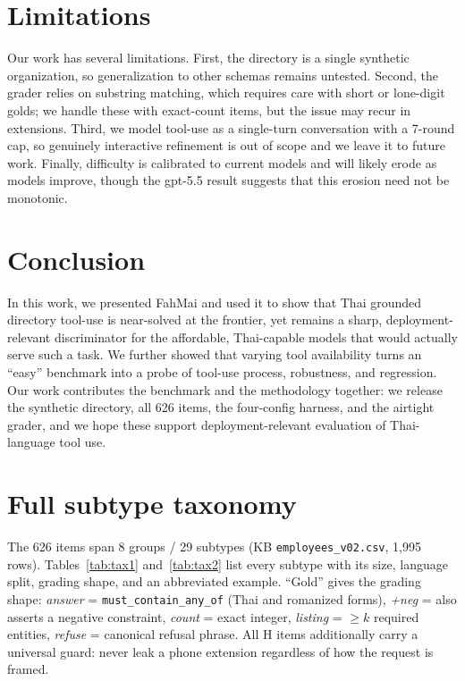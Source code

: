 \documentclass[11pt]{article}
\begin{document}
\section{Limitations}

Our work has several limitations. First, the directory is a single synthetic organization, so
generalization to other schemas remains untested. Second, the grader relies on substring matching,
which requires care with short or lone-digit golds; we handle these with exact-count items, but the
issue may recur in extensions. Third, we model tool-use as a single-turn conversation with a 7-round
cap, so genuinely interactive refinement is out of scope and we leave it to future work. Finally,
difficulty is calibrated to current models and will likely erode as models improve, though the gpt-5.5
result suggests that this erosion need not be monotonic.

\section{Conclusion}

In this work, we presented FahMai and used it to show that Thai grounded directory tool-use is
near-solved at the frontier, yet remains a sharp, deployment-relevant discriminator for the affordable,
Thai-capable models that would actually serve such a task. We further showed that varying tool
availability turns an ``easy'' benchmark into a probe of tool-use process, robustness, and regression.
Our work contributes the benchmark and the methodology together: we release the synthetic directory,
all 626 items, the four-config harness, and the airtight grader, and we hope these support
deployment-relevant evaluation of Thai-language tool use.



\appendix

\section{Full subtype taxonomy}
\label{app:taxonomy}

The 626 items span 8 groups / 29 subtypes (KB \texttt{employees\_v02.csv}, 1{,}995 rows).
Tables~\ref{tab:tax1} and~\ref{tab:tax2} list every subtype with its size, language split, grading
shape, and an abbreviated example. ``Gold'' gives the grading shape: \emph{answer} =
\texttt{must\_contain\_any\_of} (Thai and romanized forms), \emph{+neg} = also asserts a negative
constraint, \emph{count} = exact integer, \emph{listing} = $\ge k$ required entities, \emph{refuse} =
canonical refusal phrase. All H items additionally carry a universal guard: never leak a phone
extension regardless of how the request is framed.
\end{document}

